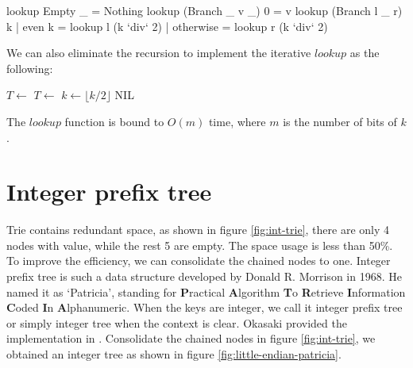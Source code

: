 \documentclass[b5paper]{article}
\begin{document}
\begin{Haskell}
lookup Empty _ = Nothing
lookup (Branch _ v _) 0 = v
lookup (Branch l _ r) k | even k    = lookup l (k `div` 2)
                        | otherwise = lookup r (k `div` 2)
\end{Haskell}

We can also eliminate the recursion to implement the iterative $lookup$ as the following:

\begin{algorithmic}[1]
      \State $T \gets$ 
    \Else
      \State $T \gets$ 
    \EndIf
    \State $k \gets \lfloor k/2 \rfloor$
  \EndWhile
    \State \Return {}
  \Else
    \State \Return NIL \EndIf
\EndFunction
\end{algorithmic}

The $lookup$ function is bound to $O(m)$ time, where $m$ is the number of bits of $k$.

\begin{Exercise}
\end{Exercise}

\section{Integer prefix tree}
\label{int-patricia}
 

Trie contains redundant space, as shown in figure \ref{fig:int-trie}, there are only 4 nodes with value, while the rest 5 are empty. The space usage is less than 50\%. To improve the efficiency, we can consolidate the chained nodes to one. Integer prefix tree is such a data structure developed by Donald R. Morrison in 1968. He named it as `Patricia', standing for \textbf{P}ractical \textbf{A}lgorithm \textbf{T}o \textbf{R}etrieve \textbf{I}nformation \textbf{C}oded \textbf{I}n \textbf{A}lphanumeric\cite{patricia-morrison}. When the keys are integer, we call it integer prefix tree or simply integer tree when the context is clear. Okasaki provided the implementation in \cite{okasaki-int-map}. Consolidate the chained nodes in figure \ref{fig:int-trie}, we obtained an integer tree as shown in figure \ref{fig:little-endian-patricia}.
\end{document}
